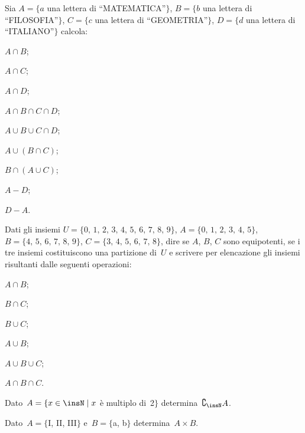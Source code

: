 \begin{esercizio}
\label{ese:5.107}
Sia $A=\{a$ una lettera di ``MATEMATICA''$\}$, $B=\{b$ una lettera di ``FILOSOFIA''$\}$, $C=\{c$ una lettera di ``GEOMETRIA''$\}$, $D=\{d$ una lettera di ``ITALIANO''$\}$ calcola:
\begin{multicols}{3}
\begin{enumeratea}
 \item $A\cap B$;
 \item $A\cap C$;
 \item $A\cap D$;
 \item $A\cap B \cap C \cap D$;
 \item $A\cup B \cup C \cap D$;
 \item $A\cup (B\cap C)$;
 \item $B\cap (A\cup C)$;
 \item $A-D$;
 \item $D-A$.
\end{enumeratea}
\end{multicols}
\end{esercizio}
\pagebreak

\begin{esercizio}
\label{ese:5.108}
Dati gli insiemi $U=\{\text{0, 1, 2, 3, 4, 5, 6, 7, 8, 9} \}$, $A=\{\text{0, 1, 2, 3, 4, 5}\}$, $B=\{\text{4, 5, 6, 7, 8, 9}\}$, $C=\{\text{3, 4, 5, 6, 7, 8}\}$, dire se $A$, $B$, $C$ sono equipotenti, se i tre insiemi costituiscono una partizione di~$U$ e scrivere per elencazione gli insiemi risultanti dalle seguenti operazioni:
\begin{multicols}{3}
\begin{enumeratea}
 \item $A\cap B$;
 \item $B\cap C$;
 \item $B\cup C$;
 \item $A\cup B$;
 \item $A\cup B \cup C$;
 \item $A\cap B\cap C$.
\end{enumeratea}
\end{multicols}
\end{esercizio}

\begin{esercizio}
\label{ese:5.109}
Dato~$A=\{x\in\insN\mid x$ è multiplo di~2$\}$ determina~$\complement_{\insN}A$.
\end{esercizio}

\begin{esercizio}
\label{ese:5.110}
Dato~$A=\{$I, II, III$\}$ e~$B=\{$a, b$\}$ determina~$A\times B$.
\end{esercizio}

